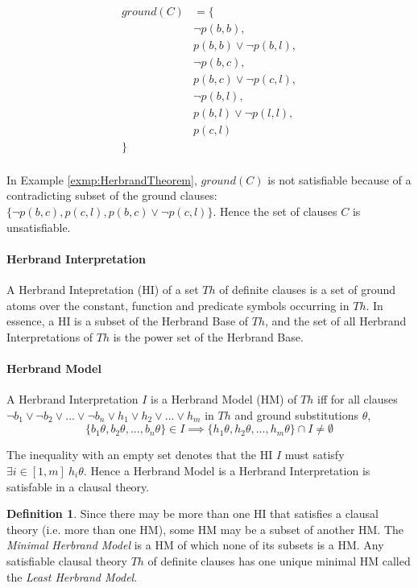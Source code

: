 \documentclass{article}
\theoremstyle{plain}
\theoremstyle{definition}
\newtheorem{defn}[thm]{Definition} %
\begin{document}
\begin{multicols}{2}
\begin{align*}
ground(C) &= \{\\
	&\lnot p(b, b),\\
	&p(b, b) \lor \lnot p(b, l),\\
	&\lnot p(b, c),\\
	&p(b, c) \lor \lnot p(c, l),\\
	&\lnot p(b, l),\\
	&p(b, l) \lor \lnot p(l, l),\\
	&p(c, l)\\
	\}\ \ \ \ &
\end{align*}

\paragraph{} In Example \ref{exmp:HerbrandTheorem}, $ground(C)$ is not satisfiable because of a contradicting subset of the ground clauses: $\{\lnot p(b, c), p(c, l), p(b, c) \lor\lnot p(c, l)\}$. Hence the set of clauses $C$ is unsatisfiable.


\paragraph{Herbrand Interpretation} A Herbrand Intepretation (HI) of a set $Th$ of definite clauses is a set of ground atoms over the constant, function and predicate symbols occurring in $Th$. In essence, a HI is a subset of the Herbrand Base of $Th$, and the set of all Herbrand Interpretations of $Th$ is the power set of the Herbrand Base.

\paragraph{Herbrand Model} A Herbrand Interpretation $I$ is a Herbrand Model (HM) of $Th$ iff for all clauses $\lnot b_1 \lor \lnot b_2 \lor ... \lor \lnot b_n \lor h_1 \lor h_2 \lor ... \lor h_m$ in $Th$ and ground substitutions $\theta$, $$\{b_1\theta, b_2\theta, ..., b_n\theta\} \in I \implies \{h_1\theta, h_2\theta, ..., h_m\theta\} \cap I \not= \emptyset$$

\noindent The inequality with an empty set denotes that the HI $I$ must satisfy $\exists i \in [1, m]\ h_i\theta$. Hence a Herbrand Model is a Herbrand Interpretation is satisfable in a clausal theory.

\begin{defn} Since there may be more than one HI that satisfies a clausal theory (i.e. more than one HM), some HM may be a subset of another HM. The \textit{Minimal Herbrand Model} is a HM of which none of its subsets is a HM. Any satisfiable clausal theory $Th$ of definite clauses has one unique minimal HM called the \textit{Least Herbrand Model}. \end{defn}


\end{multicols}
\end{document}
